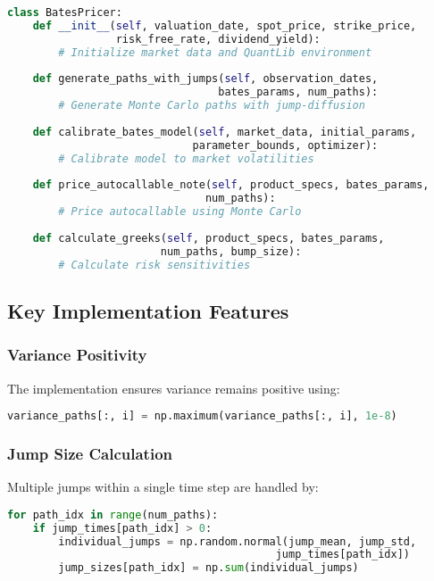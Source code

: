 \documentclass[12pt,a4paper]{article}
\begin{document}
\begin{lstlisting}[language=Python, caption=Bates Pricer Class Structure]
class BatesPricer:
    def __init__(self, valuation_date, spot_price, strike_price, 
                 risk_free_rate, dividend_yield):
        # Initialize market data and QuantLib environment
        
    def generate_paths_with_jumps(self, observation_dates, 
                                 bates_params, num_paths):
        # Generate Monte Carlo paths with jump-diffusion
        
    def calibrate_bates_model(self, market_data, initial_params, 
                             parameter_bounds, optimizer):
        # Calibrate model to market volatilities
        
    def price_autocallable_note(self, product_specs, bates_params, 
                               num_paths):
        # Price autocallable using Monte Carlo
        
    def calculate_greeks(self, product_specs, bates_params, 
                        num_paths, bump_size):
        # Calculate risk sensitivities
\end{lstlisting}

\subsection{Key Implementation Features}

\subsubsection{Variance Positivity}
The implementation ensures variance remains positive using:
\begin{lstlisting}[language=Python]
variance_paths[:, i] = np.maximum(variance_paths[:, i], 1e-8)
\end{lstlisting}

\subsubsection{Jump Size Calculation}
Multiple jumps within a single time step are handled by:
\begin{lstlisting}[language=Python]
for path_idx in range(num_paths):
    if jump_times[path_idx] > 0:
        individual_jumps = np.random.normal(jump_mean, jump_std, 
                                          jump_times[path_idx])
        jump_sizes[path_idx] = np.sum(individual_jumps)
\end{lstlisting}
\end{document}
